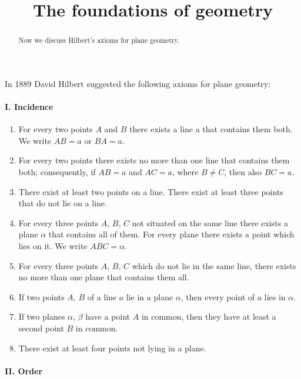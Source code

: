\documentclass{ximera}
\title{The foundations of geometry}
\begin{document}
\begin{abstract}
Now we discuss Hilbert's axioms for plane geometry.
\end{abstract}
\maketitle

In 1889 David Hilbert suggested the following axioms for plane geometry:

\paragraph{I. Incidence}
\begin{enumerate}
\item For every two points $A$ and $B$ there exists a line a that
  contains them both. We write $AB = a$ or $BA = a$.

\item For every two points there exists no more than one line that
  contains them both; consequently, if $AB = a$ and $AC = a$, where
  $B\ne C$, then also $BC = a$.

\item There exist at least two points on a line. There exist at least three
points that do not lie on a line.

\item For every three points $A$, $B$, $C$ not situated on the same
  line there exists a plane $\alpha$ that contains all of them. For
  every plane there exists a point which lies on it. We write $ABC =
  \alpha$.

\item For every three points $A$, $B$, $C$ which do not lie in the
  same line, there exists no more than one plane that contains them
  all.

\item If two points $A$, $B$ of a line $a$ lie in a plane $\alpha$,
  then every point of $a$ lies in $\alpha$.

\item If two planes $\alpha$, $\beta$ have a point $A$ in common, then
  they have at least a second point $B$ in common.

\item There exist at least four points not lying in a plane.
\end{enumerate}

\paragraph{II. Order}
\end{document}
